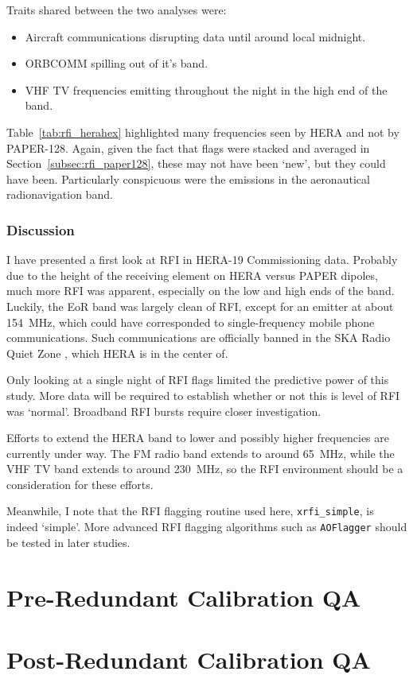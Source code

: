 Traits shared between the two analyses were:
\begin{itemize}
\item Aircraft communications disrupting data until around local midnight.
\item ORBCOMM spilling out of it's band.
\item VHF TV frequencies emitting throughout the night in the high end of the band.
\end{itemize} 

Table~\ref{tab:rfi_herahex} highlighted many frequencies seen by HERA and not by PAPER-128. Again, given the fact that flags were stacked and averaged in Section~\ref{subsec:rfi_paper128}, these may not have been `new', but they could have been. Particularly conspicuous were the emissions in the aeronautical radionavigation band.

\subsubsection{Discussion}
\label{subsubsec:rfi_herapaper_conc}

I have presented a first look at RFI in HERA-19 Commissioning data. Probably due to the height of the receiving element on HERA versus PAPER dipoles, much more RFI was apparent, especially on the low and high ends of the band. Luckily, the EoR band was largely clean of RFI, except for an emitter at about 154~MHz, which could have corresponded to single-frequency mobile phone communications. Such communications are officially banned in the SKA Radio Quiet Zone \citep{SAKRQZ}, which HERA is in the center of.

Only looking at a single night of RFI flags limited the predictive power of this study. More data will be required to establish whether or not this is level of RFI was `normal'. Broadband RFI bursts require closer investigation.

Efforts to extend the HERA band to lower and possibly higher frequencies are currently under way. The FM radio band extends to around 65~MHz, while the VHF TV band extends to around 230~MHz, so the RFI environment should be a consideration for these efforts.

Meanwhile, I note that the RFI flagging routine used here, {\tt xrfi\_simple}, is indeed `simple'. More advanced RFI flagging algorithms such as {\tt AOFlagger} \citep{AOflag} should be tested in later studies.

\section{Pre-Redundant Calibration QA}

\section{Post-Redundant Calibration QA}
